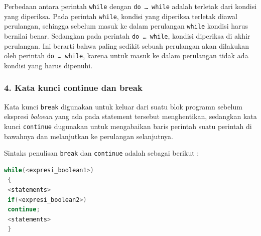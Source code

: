 Perbedaan antara perintah \texttt{while} dengan
\texttt{do\ \ldots{}\ while} adalah terletak dari kondisi yang
diperiksa. Pada perintah \texttt{while}, kondisi yang diperiksa terletak
diawal perulangan, sehingga sebelum masuk ke dalam perulangan
\texttt{while} kondisi harus bernilai benar. Sedangkan pada perintah
\texttt{do\ \ldots{}\ while}, kondisi diperiksa di akhir perulangan. Ini
berarti bahwa paling sedikit sebuah perulangan akan dilakukan oleh
perintah \texttt{do\ \ldots{}\ while}, karena untuk masuk ke dalam
perulangan tidak ada kondisi yang harus dipenuhi.

\subsubsection{4. Kata kunci continue dan
break}\label{kata-kunci-continue-dan-break}

Kata kunci \texttt{break} digunakan untuk keluar dari suatu blok
programn sebelum ekspresi \emph{boloean} yang ada pada statement
tersebut menghentikan, sedangkan kata kunci \texttt{continue} dugunakan
untuk mengabaikan baris perintah suatu perintah di bawahnya dan
melanjutkan ke perulangan selanjutnya.

Sintaks penulisan \texttt{break} dan \texttt{continue} adalah sebagai
berikut :

\begin{lstlisting}[language=c++]
 while(<expresi_boolean1>)
 {
 <statements>
 if(<expresi_boolean2>)
 continue;
 <statements>
 }
\end{lstlisting}
